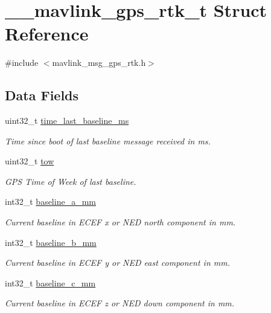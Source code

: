 \hypertarget{struct____mavlink__gps__rtk__t}{\section{\+\_\+\+\_\+mavlink\+\_\+gps\+\_\+rtk\+\_\+t Struct Reference}
\label{struct____mavlink__gps__rtk__t}
}


{\ttfamily \#include $<$mavlink\+\_\+msg\+\_\+gps\+\_\+rtk.\+h$>$}

\subsection*{Data Fields}
\begin{DoxyCompactItemize}
\item 
uint32\+\_\+t \hyperlink{struct____mavlink__gps__rtk__t_a1d9284c69d15af78d221384f10f8622f}{time\+\_\+last\+\_\+baseline\+\_\+ms}
\begin{DoxyCompactList}\small\item\em Time since boot of last baseline message received in ms. \end{DoxyCompactList}\item 
uint32\+\_\+t \hyperlink{struct____mavlink__gps__rtk__t_aa768e5f8cfb96b71f6e128e9936c29ca}{tow}
\begin{DoxyCompactList}\small\item\em G\+P\+S Time of Week of last baseline. \end{DoxyCompactList}\item 
int32\+\_\+t \hyperlink{struct____mavlink__gps__rtk__t_ae00834f14f3a2e1bf64c1e9b63493214}{baseline\+\_\+a\+\_\+mm}
\begin{DoxyCompactList}\small\item\em Current baseline in E\+C\+E\+F x or N\+E\+D north component in mm. \end{DoxyCompactList}\item 
int32\+\_\+t \hyperlink{struct____mavlink__gps__rtk__t_a3f7489516e86ebcb1702edac1ca8170c}{baseline\+\_\+b\+\_\+mm}
\begin{DoxyCompactList}\small\item\em Current baseline in E\+C\+E\+F y or N\+E\+D east component in mm. \end{DoxyCompactList}\item 
int32\+\_\+t \hyperlink{struct____mavlink__gps__rtk__t_a394109be67f36b661b13c760228dfd86}{baseline\+\_\+c\+\_\+mm}
\begin{DoxyCompactList}\small\item\em Current baseline in E\+C\+E\+F z or N\+E\+D down component in mm. \end{DoxyCompactList}\item 

\end{DoxyCompactItemize}

